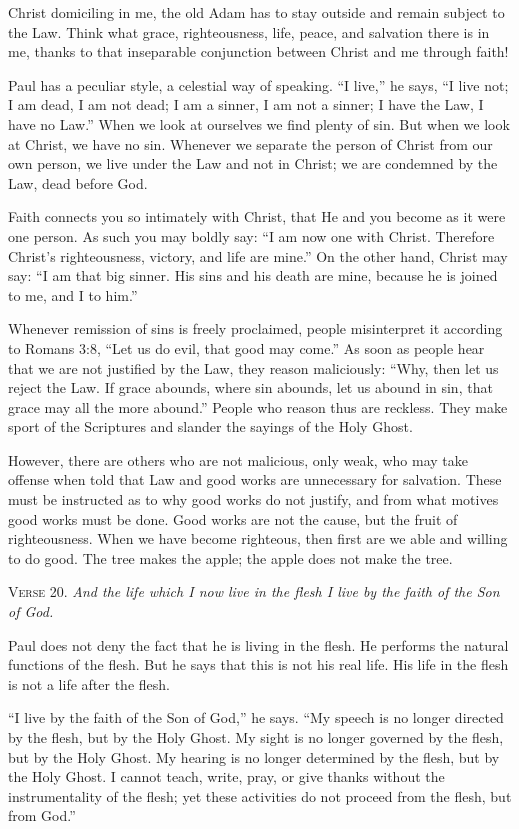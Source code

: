 Christ domiciling in me, the old Adam has to stay outside and remain subject to the Law. Think what grace, righteousness, life, peace, and salvation there is in me, thanks to that inseparable conjunction between Christ and me through faith!

Paul has a peculiar style, a celestial way of speaking. “I live,” he says, “I live not; I am dead, I am not dead; I am a sinner, I am not a sinner; I have the Law, I have no Law.” When we look at ourselves we find plenty of sin. But when we look at Christ, we have no sin. Whenever we separate the person of Christ from our own person, we live under the Law and not in Christ; we are condemned by the Law, dead before God.

Faith connects you so intimately with Christ, that He and you become as it were one person. As such you may boldly say: “I am now one with Christ. Therefore Christ’s righteousness, victory, and life are mine.” On the other hand, Christ may say: “I am that big sinner. His sins and his death are mine, because he is joined to me, and I to him.”

Whenever remission of sins is freely proclaimed, people misinterpret it according to Romans 3:8, “Let us do evil, that good may come.” As soon as people hear that we are not justified by the Law, they reason maliciously: “Why, then let us reject the Law. If grace abounds, where sin abounds, let us abound in sin, that grace may all the more abound.” People who reason thus are reckless. They make sport of the Scriptures and slander the sayings of the Holy Ghost.

However, there are others who are not malicious, only weak, who may take offense when told that Law and good works are unnecessary for salvation. These must be instructed as to why good works do not justify, and from what motives good works must be done. Good works are not the cause, but the fruit of righteousness. When we have become righteous, then first are we able and willing to do good. The tree makes the apple; the apple does not make the tree.

\textsc{Verse} 20. \emph{And the life which I now live in the flesh I live by the faith of the Son of God.}

Paul does not deny the fact that he is living in the flesh. He performs the natural functions of the flesh. But he says that this is not his real life. His life in the flesh is not a life after the flesh.

“I live by the faith of the Son of God,” he says. “My speech is no longer directed by the flesh, but by the Holy Ghost. My sight is no longer governed by the flesh, but by the Holy Ghost. My hearing is no longer determined by the flesh, but by the Holy Ghost. I cannot teach, write, pray, or give thanks without the instrumentality of the flesh; yet these activities do not proceed from the flesh, but from God.”

